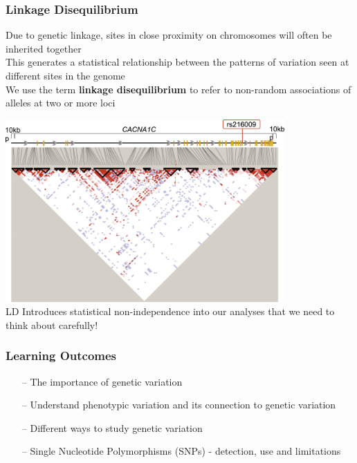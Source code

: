 \documentclass{beamer}
\begin{document}
\begin{frame}
	\frametitle{Linkage Disequilibrium}
\scriptsize 
	Due to genetic linkage, sites in close proximity on chromosomes will often be inherited together\\
	This generates a statistical relationship between the patterns of variation seen at different sites in the genome\\
	We use the term \textbf{linkage disequilibrium} to refer to non-random associations of alleles at two or more loci
	
				\includegraphics[keepaspectratio, width  = 0.8\textwidth]{img/LD_heat}\\

\vspace{10pt}
LD Introduces statistical non-independence into our analyses that we need to think about carefully!	
\end{frame}


\begin{frame}
	\frametitle{Learning Outcomes}
	\begin{itemize}
	\item[--] The importance of genetic variation
\item[--] Understand phenotypic variation and its connection to genetic variation
\item[--] Different ways to study genetic variation
\item[--] Single Nucleotide Polymorphisms (SNPs) - detection, use and limitations
	\end{itemize}
\end{frame}
\end{document}
